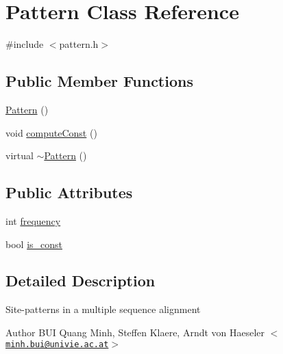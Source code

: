 \hypertarget{classPattern}{
\section{Pattern Class Reference}
\label{classPattern}
}


{\ttfamily \#include $<$pattern.h$>$}\subsection*{Public Member Functions}
\begin{DoxyCompactItemize}
\item 
\hyperlink{classPattern_a95f42b0f1717d9e6c2d831e87d27f83c}{Pattern} ()
\item 
void \hyperlink{classPattern_a59d62a45aa4541a8fe378bae9b25b9af}{computeConst} ()
\item 
virtual \hyperlink{classPattern_a6e8b9388bbd39934e9f9534b974d7498}{$\sim$Pattern} ()
\end{DoxyCompactItemize}
\subsection*{Public Attributes}
\begin{DoxyCompactItemize}
\item 
int \hyperlink{classPattern_aa7c284ee648d82461922d6c1d6214631}{frequency}
\item 
bool \hyperlink{classPattern_af6375248ff24797d1e0e8177a98c93b8}{is\_\-const}
\end{DoxyCompactItemize}


\subsection{Detailed Description}
Site-\/patterns in a multiple sequence alignment \begin{DoxyAuthor}{Author}
BUI Quang Minh, Steffen Klaere, Arndt von Haeseler $<$\href{mailto:minh.bui@univie.ac.at}{\tt minh.bui@univie.ac.at}$>$ 
\end{DoxyAuthor}


